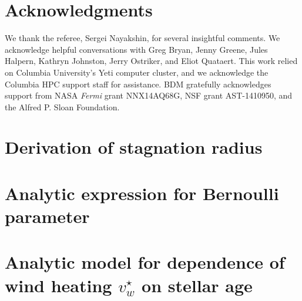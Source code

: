 \documentclass[usenatbib,fleqn]{mn2e}
\newcommand{\vwO}{v_{w}}
\begin{document}
\section*{Acknowledgments}

We thank the referee, Sergei Nayakshin, for several insightful
comments. We acknowledge helpful conversations with Greg Bryan, Jenny
Greene, Jules Halpern, Kathryn Johnston, Jerry Ostriker, and Eliot
Quataert.  This work relied on Columbia University's Yeti computer
cluster, and we acknowledge the Columbia HPC support staff for
assistance.  BDM gratefully acknowledges support from NASA {\it Fermi}
grant NNX14AQ68G, NSF grant AST-1410950, and the Alfred P. Sloan
Foundation.


  \clearpage
  \appendix
  \section{Derivation of stagnation radius}
  \label{app:rs}
  

  \section{Analytic expression for Bernoulli parameter}
  \label{app:be}
  

  \section{Analytic model for dependence of wind heating $\vwO^{\star}$ on stellar age}
\label{app:windheat}


  \footnotesize{
    
    
  }
\end{document}
